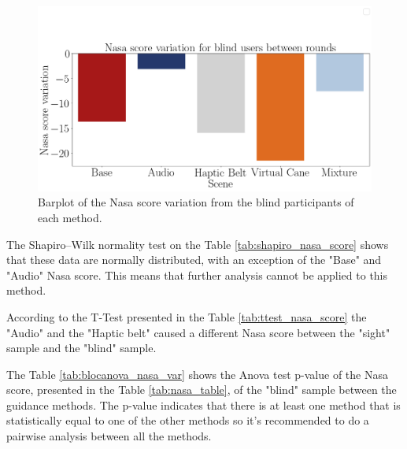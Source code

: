 \begin{figure}[!htb]
    \centering
    \includegraphics[width = 0.8\linewidth]{Resultados/Nasa/Figuras/png/barplot_nasa_var_scene_blind.png}
    \caption{Barplot of the Nasa score variation from the blind participants of each method.}
    \label{fig:barplot_nasa_var_scene_blind}
\end{figure}

The Shapiro–Wilk normality test on the Table \ref{tab:shapiro_nasa_score} shows that these data are normally distributed, with an exception of the "Base" and "Audio" Nasa score. This means that further analysis cannot be applied to this method.

According to the T-Test presented in the Table \ref{tab:ttest_nasa_score} the "Audio" and the "Haptic belt" caused a different Nasa score between the "sight" sample and the "blind" sample.

\begin{table}[!htb]
    \begin{minipage}{.45\linewidth}
        
    \end{minipage}
    \hfill
    \begin{minipage}{.45\linewidth}
        \vspace{-2.75cm}
        
    \end{minipage}
\end{table}

The Table \ref{tab:blocanova_nasa_var} shows the Anova test p-value of the Nasa score, presented in the Table \ref{tab:nasa_table}, of the "blind" sample between the guidance methods. The p-value indicates that there is at least one method that is statistically equal to one of the other methods so it's recommended to do a pairwise analysis between all the methods.

